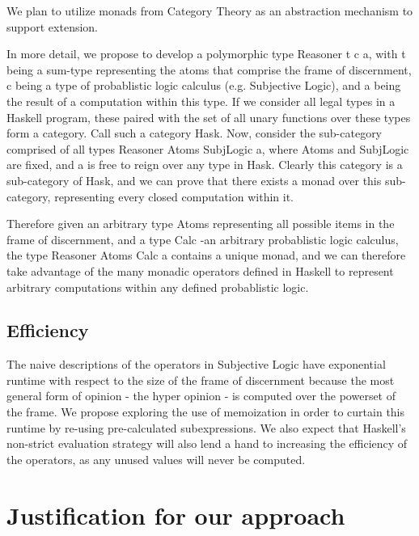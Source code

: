 \documentclass[a4paper]{article}
\begin{document}
\par
We plan to utilize monads from Category Theory as an abstraction mechanism to support
extension. 


\par
In more detail, we propose to develop a polymorphic type Reasoner t c a, with t being a sum-type
representing the atoms that comprise the frame of discernment, c being a type of probablistic logic
calculus (e.g. Subjective Logic), and a being the result of a computation within this type. If we
consider all legal types in a Haskell program, these paired with the set of all unary functions over
these types form a category. Call such a category Hask. Now, consider the sub-category comprised of
all types Reasoner Atoms SubjLogic a, where Atoms and SubjLogic are fixed, and a is free to reign over
any type in Hask. Clearly this category is a sub-category of Hask, and we can prove that there exists
a monad over this sub-category, representing every closed computation within it.

\par
Therefore given an arbitrary type Atoms representing all possible items in the frame of discernment,
and a type Calc -an arbitrary probablistic logic calculus, the type Reasoner Atoms Calc a contains a
unique monad, and we can therefore take advantage of the many monadic operators defined in Haskell
to represent arbitrary computations within any defined probablistic logic.

\subsection{Efficiency}

\par
The naive descriptions of the operators in Subjective Logic have exponential runtime with respect
to the size of the frame of discernment because the most general form of opinion - the hyper
opinion - is computed over the powerset of the frame. We propose exploring the use of memoization
in order to curtain this runtime by re-using pre-calculated subexpressions.
We also expect that Haskell's non-strict evaluation strategy will also lend a hand to
increasing the efficiency of the operators, as any unused values will never be computed.

\section{Justification for our approach}
\end{document}

